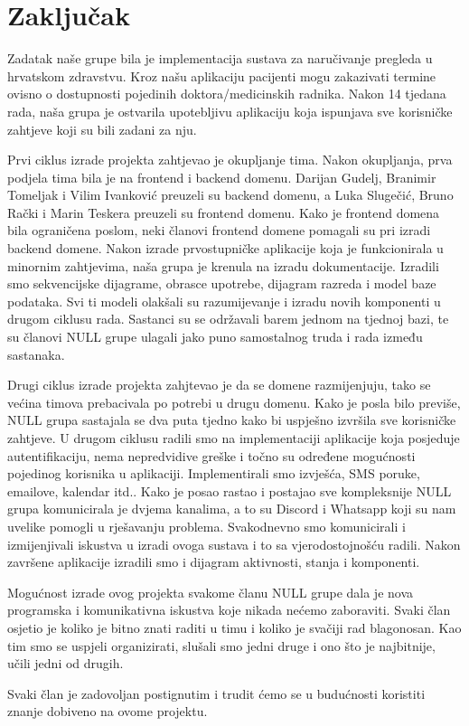 \chapter{Zaključak}
		
		 \texttt{}{Zadatak naše grupe bila je implementacija sustava za naručivanje pregleda u hrvatskom zdravstvu. Kroz našu aplikaciju pacijenti mogu zakazivati termine ovisno o dostupnosti pojedinih doktora/medicinskih radnika. Nakon 14 tjedana rada, naša grupa je ostvarila upotebljivu aplikaciju koja ispunjava sve korisničke zahtjeve koji su bili zadani za nju. }
   
   
          \texttt{}{
          Prvi ciklus izrade projekta zahtjevao je okupljanje tima. Nakon okupljanja, prva podjela tima bila je na frontend i backend domenu. Darijan Gudelj, Branimir Tomeljak i Vilim Ivanković preuzeli su backend domenu, a Luka Slugečić, Bruno Rački i Marin Teskera preuzeli su frontend domenu. Kako je frontend domena bila ograničena poslom, neki članovi frontend domene pomagali su pri izradi backend domene. Nakon izrade prvostupničke aplikacije koja je funkcionirala u minornim zahtjevima, naša grupa je krenula na izradu dokumentacije. Izradili smo sekvencijske dijagrame, obrasce upotrebe, dijagram razreda i model baze podataka. Svi ti modeli olakšali su razumijevanje i izradu novih komponenti u drugom ciklusu rada. Sastanci su se održavali barem jednom na tjednoj bazi, te su članovi NULL grupe ulagali jako puno samostalnog truda i rada između sastanaka.
          }

          \texttt{}{
          Drugi ciklus izrade projekta zahjtevao je da se domene razmijenjuju, tako se većina timova prebacivala po potrebi u drugu domenu. Kako je posla bilo previše, NULL grupa sastajala se dva puta tjedno kako bi uspješno izvršila sve korisničke zahtjeve. U drugom ciklusu radili smo na implementaciji aplikacije koja posjeduje autentifikaciju, nema nepredvidive greške i točno su određene mogućnosti pojedinog korisnika u aplikaciji. Implementirali smo izvješća, SMS poruke, emailove, kalendar itd.. Kako je posao rastao i postajao sve kompleksnije NULL grupa komunicirala je dvjema kanalima, a to su Discord i Whatsapp koji su nam uvelike pomogli u rješavanju problema. Svakodnevno smo komunicirali i izmijenjivali iskustva u izradi ovoga sustava i to sa vjerodostojnošću radili. Nakon završene aplikacije izradili smo i dijagram aktivnosti, stanja i komponenti. 

          Mogućnost izrade ovog projekta svakome članu NULL grupe dala je nova programska i komunikativna iskustva koje nikada nećemo zaboraviti. Svaki član osjetio je koliko je bitno znati raditi u timu i koliko je svačiji rad blagonosan. Kao tim smo se uspjeli organizirati, slušali smo jedni druge i ono što je najbitnije, učili jedni od drugih. 

          Svaki član je zadovoljan postignutim i trudit ćemo se u budućnosti koristiti znanje dobiveno na ovome projektu.
          }
		
		\eject 